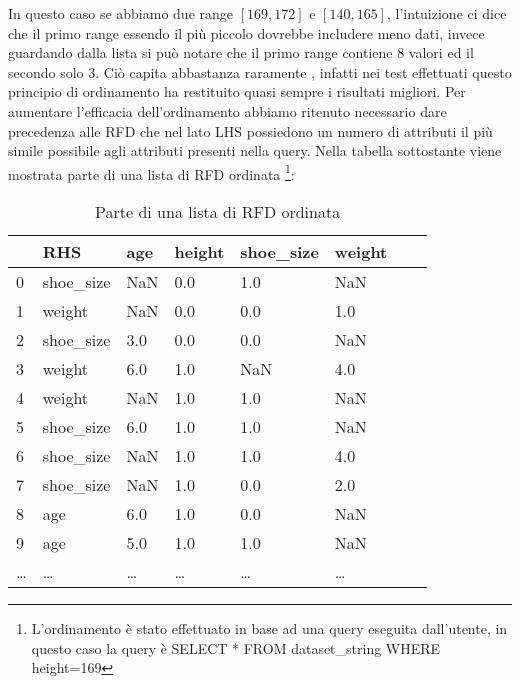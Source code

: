 In questo caso se abbiamo due range $[169,172]$ e $[140,165]$, l'intuizione ci dice che il primo range essendo il più piccolo dovrebbe includere meno dati, invece guardando dalla lista si può notare che il primo range contiene 8 valori ed il secondo solo 3.
Ciò capita abbastanza raramente , infatti nei test effettuati questo principio di ordinamento ha restituito quasi sempre i risultati migliori.
Per aumentare l'efficacia dell'ordinamento abbiamo ritenuto necessario dare precedenza alle RFD che nel lato LHS possiedono un numero di attributi il più simile possibile agli attributi presenti nella query.
Nella tabella sottostante viene mostrata parte di una lista di RFD ordinata \footnote{L'ordinamento è stato effettuato in base ad una query eseguita dall'utente, in questo caso la query è SELECT * FROM dataset{\_}string WHERE height=169}:
\begin{table}[H]
    \centering
    \begin{tabular}{l l l l l l l l}
        & RHS & age & height & shoe{\_}size & weight \\
        \hline
    0 & shoe{\_}size & NaN & 0.0 & 1.0 & NaN \\
    1 & weight & NaN & 0.0 & 0.0 & 1.0 \\
    2 & shoe{\_}size & 3.0 & 0.0 & 0.0 & NaN \\
    3 & weight & 6.0 & 1.0 & NaN & 4.0 \\
    4 & weight & NaN & 1.0 & 1.0 & NaN \\
    5 & shoe{\_}size & 6.0 & 1.0 & 1.0 & NaN \\
    6 & shoe{\_}size & NaN & 1.0 & 1.0 & 4.0 \\
    7 & shoe{\_}size & NaN & 1.0 & 0.0 & 2.0 \\
    8 & age & 6.0 & 1.0 & 0.0 & NaN \\
    9 & age & 5.0 & 1.0 & 1.0 & NaN \\
    \ldots & \ldots & \ldots & \ldots & \ldots & \ldots \\
    \end{tabular}
    \caption{Parte di una lista di RFD ordinata}
    \label{tab:ord_rdf}
\end{table}


